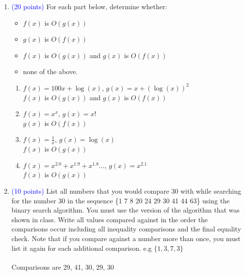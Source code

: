 \documentclass{article}
\newcommand{\pt}[1]{\textcolor{blue}{(#1 points)}}
\begin{document}
\begin{enumerate}
\item \pt{20} For each part below, determine whether:
\begin{itemize}
\item $f(x)$ is $O(g(x))$ 
\item $g(x)$ is $O(f(x))$
\item $f(x)$ is $O(g(x))$ and $g(x)$ is $O(f(x))$ \item none of the above.
\end{itemize}
\begin{enumerate}
    \item $f(x) = 100x + \log(x)$, $g(x) = x + (\log(x))^2$
    \\$f(x)$ is $O(g(x))$ and $g(x)$ is $O(f(x))$
    \item $f(x) = x^x$, $g(x) = x!$
    \\$g(x)$ is $O(f(x))$
    \item $f(x) = \frac{1}{x}$, $g(x) = \log(x)$
    \\ $f(x)$ is $O(g(x))$ 
    \item $f(x) = x^{2.0} + x^{1.9} + x^{1.8}...$, $g(x) = x^{2.1}$
    \\$f(x)$ is $O(g(x))$ 
\end{enumerate}

\item \pt{10} List all numbers that you would compare 30 with while searching for the number 30 in the sequence \{1 7 8 20 24 29 30 41 44 63\} using the binary search algorithm. You must use the version of the algorithm that was shown in class. Write all values compared against in the order the comparisons occur including all inequality comparisons and the final equality check. Note that if you compare against a number more than once, you must list it again for each additional comparison. e.g $\{1, 3, 7, 3\}$
\\\\ Comparisons are 29, 41, 30, 29, 30


\end{enumerate}
\end{document}
